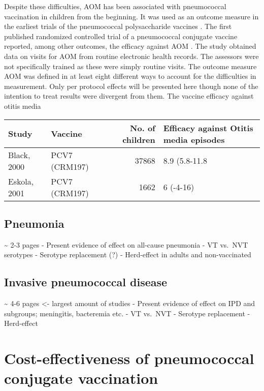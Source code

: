 \documentclass[]{book}
\theoremstyle{definition}
\theoremstyle{definition}
\theoremstyle{definition}
\theoremstyle{remark}
\begin{document}
Despite these difficulties, AOM has been associated with pneumococcal
vaccination in children from the beginning. It was used as an outcome
measure in the earliest trials of the pneumococcal polysaccharide
vaccines \citep{Makela1981, Sloyer1981}. The first published randomized
controlled trial of a pneumococcal conjugate vaccine reported, among
other outcomes, the efficacy against AOM \citep{Black2000}. The study
obtained data on visits for AOM from routine electronic health records.
The assessors were not specifically trained as these were simply routine
visits. The outcome measure AOM was defined in at least eight different
ways to account for the difficulties in measurement. Only per protocol
effects will be presented here though none of the intention to treat
results were divergent from them. The vaccine efficacy against otitis
media

\begin{tabular}{llrl}
\toprule
Study & Vaccine & No. of children & Efficacy against Otitis media episodes\\
\midrule
Black, 2000 & PCV7 (CRM197) & 37868 & 8.9 (5.8-11.8\\
Eskola, 2001 & PCV7 (CRM197) & 1662 & 6 (-4-16)\\
\bottomrule
\end{tabular}

\subsection{Pneumonia}\label{pneumonia-1}

\textasciitilde{} 2-3 pages - Present evidence of effect on all-cause
pneumonia - VT vs.~NVT serotypes - Serotype replacement (?) -
Herd-effect in adults and non-vaccinated

\subsection{Invasive pneumococcal
disease}\label{invasive-pneumococcal-disease-1}

\textasciitilde{} 4-6 pages \textless{}- largest amount of studies -
Present evidence of effect on IPD and subgroups; meningitis, bacteremia
etc. - VT vs.~NVT - Serotype replacement - Herd-effect

\section{Cost-effectiveness of pneumococcal conjugate
vaccination}\label{cost-effectiveness-of-pneumococcal-conjugate-vaccination}
\end{document}
